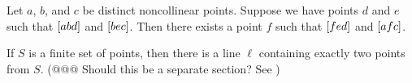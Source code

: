 \begin{exercise}
Let \(a\), \(b\), and \(c\) be distinct noncollinear points.
Suppose we have points \(d\) and \(e\) such that \([ a b d ]\) and \([ b e c ]\).
Then there exists a point \(f\) such that \([ f e d ]\) and \([ a f c ]\).
\end{exercise}

\begin{exercise}
If \(S\) is a finite set of points, then there is a line \(\ell\) containing exactly two points from \(S\). (@@@ Should this be a separate section? See \cite{pambuccian2009})
\end{exercise}
